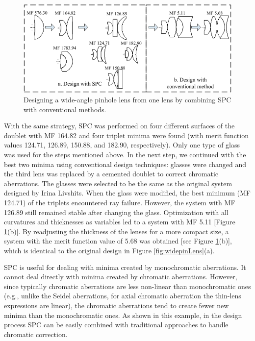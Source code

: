 \begin{figure}[h!]
    \centering
    \includegraphics[width=1.0\textwidth]{chapter-3/figures/WideAngleDesign.png}
    \caption{Designing a wide-angle pinhole lens from one lens by combining SPC with conventional methods.}
    \label{fig:WideAngleDesign}
\end{figure}

With the same strategy, SPC was performed on four different surfaces of the doublet with MF 164.82 and four triplet minima were found (with merit function values 124.71, 126.89, 150.88, and 182.90, respectively). Only one type of glass was used for the steps mentioned above. In the next step, we continued with the best two minima using conventional design techniques: glasses were changed and the third lens was replaced by a cemented doublet to correct chromatic aberrations. The glasses were selected to be the same as the original system designed by Irina Livshits. When the glass were modified, the best minimum (MF 124.71) of the triplets encountered ray failure. However, the system with MF 126.89 still remained stable after changing the glass. Optimization with all curvatures and thicknesses as variables led to a system with MF 5.11 [Figure \ref{fig:WideAngleDesign}(b)]. By readjusting the thickness of the lenses for a more compact size, a system with the merit function value of 5.68 was obtained [see Figure \ref{fig:WideAngleDesign}(b)], which is identical to the original design in Figure \ref{fig:widepinLens}(a).

SPC is useful for dealing with minima created by monochromatic aberrations. It cannot deal directly with minima created by chromatic aberrations. However, since typically chromatic aberrations are less non-linear than monochromatic ones (e.g., unlike the Seidel aberrations, for axial chromatic aberration the thin-lens expressions are linear), the chromatic aberrations tend to create fewer new minima than the monochromatic
ones. As shown in this example, in the design process SPC can be easily combined with traditional approaches to handle chromatic correction.

